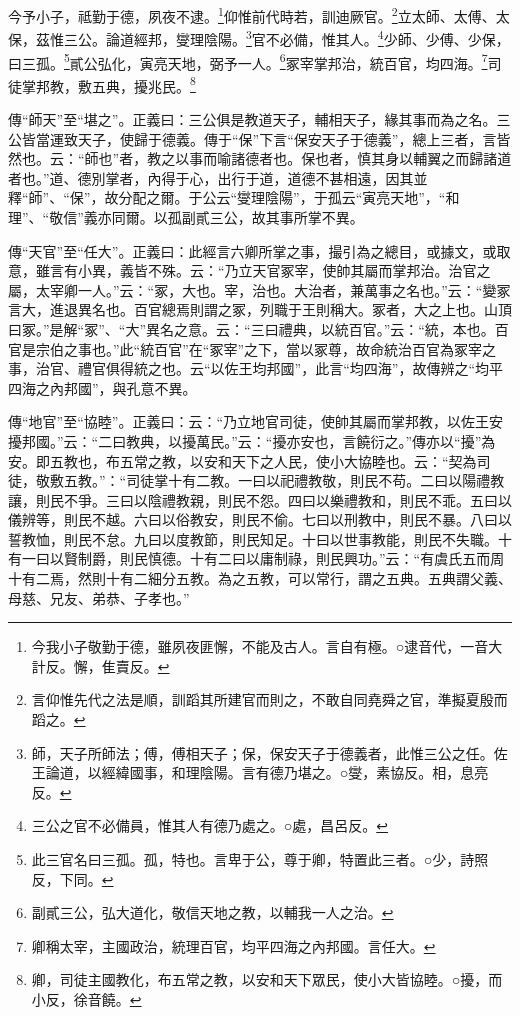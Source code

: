 今予小子，祗勤于德，夙夜不逮。\footnote{今我小子敬勤于德，雖夙夜匪懈，不能及古人。言自有極。○逮音代，一音大計反。懈，隹賣反。}仰惟前代時若，訓迪厥官。\footnote{言仰惟先代之法是順，訓蹈其所建官而則之，不敢自同堯舜之官，準擬夏殷而蹈之。}立太師、太傅、太保，茲惟三公。論道經邦，燮理陰陽。\footnote{師，天子所師法；傅，傅相天子；保，保安天子于德義者，此惟三公之任。佐王論道，以經緯國事，和理陰陽。言有德乃堪之。○燮，素協反。相，息亮反。}官不必備，惟其人。\footnote{三公之官不必備員，惟其人有德乃處之。○處，昌呂反。}少師、少傅、少保，曰三孤。\footnote{此三官名曰三孤。孤，特也。言卑于公，尊于卿，特置此三者。○少，詩照反，下同。}貳公弘化，寅亮天地，弼予一人。\footnote{副貳三公，弘大道化，敬信天地之教，以輔我一人之治。}冢宰掌邦治，統百官，均四海。\footnote{卿稱太宰，主國政治，統理百官，均平四海之內邦國。言任大。}司徒掌邦教，敷五典，擾兆民。\footnote{卿，司徒主國教化，布五常之教，以安和天下眾民，使小大皆協睦。○擾，而小反，徐音饒。}


{\noindent\zhuan{}\fzbyks 傳“師天”至“堪之”。正義曰：三公俱是教道天子，輔相天子，緣其事而為之名。三公皆當運致天子，使歸于德義。傳于“保”下言“保安天子于德義”，總上三者，言皆然也。云：“師也”者，教之以事而喻諸德者也。保也者，慎其身以輔翼之而歸諸道者也。”道、德別掌者，內得于心，出行于道，道德不甚相遠，因其並釋“師”、“保”，故分配之爾。于公云“燮理陰陽”，于孤云“寅亮天地”，“和理”、“敬信”義亦同爾。以孤副貳三公，故其事所掌不異。 \par}

{\noindent\zhuan{}\fzbyks 傳“天官”至“任大”。正義曰：此經言六卿所掌之事，撮引為之總目，或據文，或取意，雖言有小異，義皆不殊。云：“乃立天官冢宰，使帥其屬而掌邦治。治官之屬，太宰卿一人。”云：“冢，大也。宰，治也。大治者，兼萬事之名也。”云：“變冢言大，進退異名也。百官總焉則謂之冢，列職于王則稱大。冢者，大之上也。山頂曰冢。”是解“冢”、“大”異名之意。云：“三曰禮典，以統百官。”云：“統，本也。百官是宗伯之事也。”此“統百官”在“冢宰”之下，當以冢尊，故命統治百官為冢宰之事，治官、禮官俱得統之也。云“以佐王均邦國”，此言“均四海”，故傳辨之“均平四海之內邦國”，與孔意不異。 \par}

{\noindent\zhuan{}\fzbyks 傳“地官”至“協睦”。正義曰：云：“乃立地官司徒，使帥其屬而掌邦教，以佐王安擾邦國。”云：“二曰教典，以擾萬民。”云：“擾亦安也，言饒衍之。”傳亦以“擾”為安。即五教也，布五常之教，以安和天下之人民，使小大協睦也。云：“契為司徒，敬敷五教。”：“司徒掌十有二教。一曰以祀禮教敬，則民不苟。二曰以陽禮教讓，則民不爭。三曰以陰禮教親，則民不怨。四曰以樂禮教和，則民不乖。五曰以儀辨等，則民不越。六曰以俗教安，則民不偷。七曰以刑教中，則民不暴。八曰以誓教恤，則民不怠。九曰以度教節，則民知足。十曰以世事教能，則民不失職。十有一曰以賢制爵，則民慎德。十有二曰以庸制祿，則民興功。”云：“有虞氏五而周十有二焉，然則十有二細分五教。為之五教，可以常行，謂之五典。五典謂父義、母慈、兄友、弟恭、子孝也。” \par}

